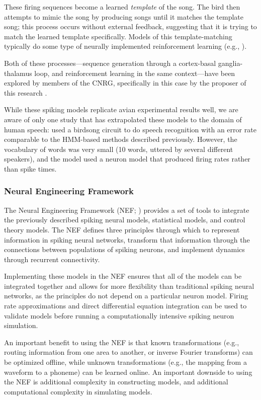 \documentclass{article}
\begin{document}
These firing sequences become
a learned \textit{template} of the song.
The bird then attempts to mimic the song
by producing songs until it matches
the template song;
this process occurs without
external feedback,
suggesting that it is trying
to match the learned template specifically.
Models of this template-matching
typically do some type of neurally
implemented reinforcement learning
(e.g., \citealp{fiete2007}).

Both of these processes---sequence generation
through a cortex-basal ganglia-thalamus loop,
and reinforcement learning in the same context---have
been explored by members of the CNRG,
specifically in this case by
the proposer of this research
\citep{stewart2012}.

While these spiking models
replicate avian experimental results well,
we are aware of only one study that
has extrapolated these models
to the domain of human speech:
\citet{yildiz2013} used a birdsong
circuit to do speech recognition
with an error rate comparable
to the HMM-based methods described previously.
However, the vocabulary of words was very small
(10 words, uttered by several different speakers),
and the model used a neuron model
that produced firing rates rather than spike times.

\subsubsection{Neural Engineering Framework}
\label{subsec:nef}

The Neural Engineering Framework (NEF; \citealp{eliasmith2003})
provides a set of tools to integrate
the previously described
spiking neural models,
statistical models,
and control theory models.
The NEF defines three principles
through which to represent
information in spiking neural networks,
transform that information through the connections
between populations of spiking neurons,
and implement dynamics through
recurrent connectivity.

Implementing these models
in the NEF ensures that all
of the models can be integrated together
and allows for more flexibility
than traditional spiking neural networks,
as the principles do not depend
on a particular neuron model.
Firing rate approximations
and direct differential equation integration
can be used to validate models
before running a computationally intensive
spiking neuron simulation.

An important benefit to using the NEF
is that known transformations
(e.g., routing information from one area
to another, or inverse Fourier transforms)
can be optimized offline,
while unknown transformations
(e.g., the mapping from a waveform
to a phoneme)
can be learned online.
An important downside to using the NEF
is additional complexity
in constructing models,
and additional computational complexity
in simulating models.
\end{document}
